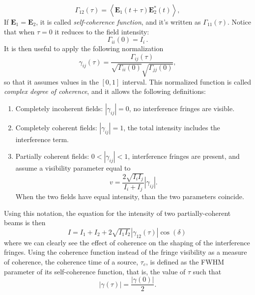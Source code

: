\begin{equation}\label{eq:mutual-coherence}
	\Gamma_{12}(\tau) = \left\langle  \mathbf{E}_1(t+\tau)\mathbf{E}_2^*(t)   \right\rangle,
\end{equation}
If $\mathbf{E}_1 = \mathbf{E}_2$, it is called \emph{self-coherence function}, and it's written as $\Gamma_{11}(\tau)$. Notice that when $\tau = 0$ it reduces to the field intensity:
\begin{equation}
	\Gamma_{ii}(0) = I_i\,.
\end{equation}
It is then useful to apply the following normalization
\begin{equation}
	\gamma_{ij} (\tau) = \frac{\Gamma_{ij}(\tau)}{\sqrt{\Gamma_{ii}(0)}\sqrt{\Gamma_{jj}(0)}},
\end{equation}
so that it assumes values in the $[0,1]$ interval. This normalized function is called \emph{complex degree of coherence}, and it allows the following definitions:
\begin{enumerate}
	\item Completely incoherent fields: $|\gamma_{ij}| = 0$, no interference fringes are visible.
	\item Completely coherent fields: $|\gamma_{ij}| = 1$, the total intensity includes the interference term. 
	\item Partially coherent fields: $0 < |\gamma_{ij}| < 1$, interference fringes are present, and assume a visibility parameter equal to 
	\begin{equation}
		v = \frac{2\sqrt{I_i I_j}}{I_i + I_j}|\gamma_{ij}|.
	\end{equation}
	When the two fields have equal intensity, than the two parameters coincide.
\end{enumerate}

Using this notation, the equation for the intensity of two partially-coherent beams is then
\begin{equation}
	I = I_1 + I_2 + 2\sqrt{I_1I_2}|\gamma_{12}(\tau)| \cos( \delta )\,
\end{equation}
where we can clearly see the effect of coherence on the shaping of the interference fringes. Using the coherence function instead of the fringe visibility as a measure of coherence, the coherence time of a source, $\tau_c$, is defined as the \ac{FWHM} parameter of its self-coherence function, that is, the value of $\tau$ such that
\begin{equation}
	|\gamma(\tau)| = \frac{|\gamma(0)|}{2}.
\end{equation}

